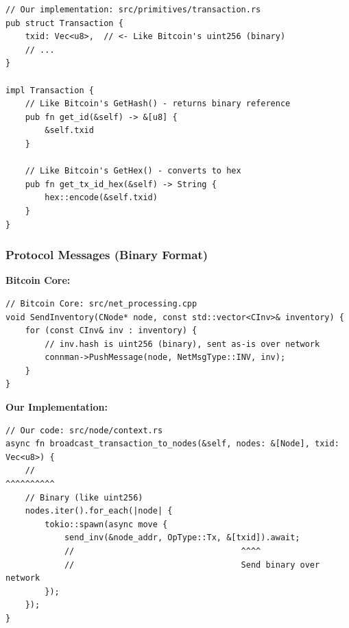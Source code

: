 \begin{listing}[H]
\caption{Our transaction ID implementation}
\label{lst:ch06-15}
\begin{verbatim}
// Our implementation: src/primitives/transaction.rs
pub struct Transaction {
    txid: Vec<u8>,  // <- Like Bitcoin's uint256 (binary)
    // ...
}

impl Transaction {
    // Like Bitcoin's GetHash() - returns binary reference
    pub fn get_id(&self) -> &[u8] {
        &self.txid
    }

    // Like Bitcoin's GetHex() - converts to hex
    pub fn get_tx_id_hex(&self) -> String {
        hex::encode(&self.txid)
    }
}
\end{verbatim}
\end{listing}

\needspace{3in}
\subsubsection{Protocol Messages (Binary Format)}
\label{sec:ch06-protocol-binary}

\textbf{Bitcoin Core:}

\begin{listing}[H]
\caption{Bitcoin Core network message construction (C++)}
\label{lst:ch06-16}
\begin{verbatim}
// Bitcoin Core: src/net_processing.cpp
void SendInventory(CNode* node, const std::vector<CInv>& inventory) {
    for (const CInv& inv : inventory) {
        // inv.hash is uint256 (binary), sent as-is over network
        connman->PushMessage(node, NetMsgType::INV, inv);
    }
}
\end{verbatim}
\end{listing}

\textbf{Our Implementation:}

\begin{listing}[H]
\caption{Our network message construction}
\label{lst:ch06-17}
\begin{verbatim}
// Our code: src/node/context.rs
async fn broadcast_transaction_to_nodes(&self, nodes: &[Node], txid: Vec<u8>) {
    //                                                         ^^^^^^^^^^
    // Binary (like uint256)
    nodes.iter().for_each(|node| {
        tokio::spawn(async move {
            send_inv(&node_addr, OpType::Tx, &[txid]).await;
            //                                  ^^^^
            //                                  Send binary over network
        });
    });
}
\end{verbatim}
\end{listing}

